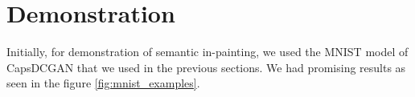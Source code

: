 \newpage

\section{Demonstration} %
\label{sec:res_demonstration}

Initially, for demonstration of semantic in-painting, we used the MNIST model of CapsDCGAN that we used in the previous sections. We had promising results as seen in the figure \ref{fig:mnist_examples}.

\begin{figure}[H]
    \centering
    \\
    \centering
    \\
    \centering

\end{figure}
